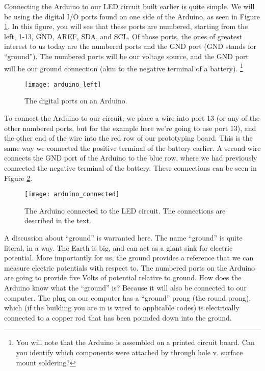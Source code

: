 Connecting the Arduino to our LED circuit built earlier is quite simple. We 
will be using the digital I/O ports found on one side of the Arduino, as 
seen in Figure \ref{fig:arduino_left}. In this figure, you will see that 
these ports are numbered, starting from the left, 1-13, GND, AREF, SDA, and
SCL. Of those ports, the ones of greatest interest to us today are the numbered
ports and the GND port (GND stands for ``ground''). The numbered ports will be
our voltage source, and the GND port will be our ground connection (akin to the
negative terminal of a battery).
\footnote{You will note that the
Arduino is assembled on a printed circuit board. Can you identify which 
components were attached by through hole v. surface mount soldering?}
\begin{figure}[hbp!]
\centering
\texttt{[image: arduino\_left]}
\caption[The digital ports on an Arduino]{The digital ports on an Arduino.}
\label{fig:arduino_left}
\end{figure}

To connect the Arduino to our circuit, we place a wire into port 13 (or any
of the other numbered ports, but for the example here we're going to use port
13), and the other end of the wire into the red row of our prototyping board.
This is the same way we connected the positive terminal of the battery earlier.
A second wire connects the GND port of the Arduino to the blue row, where we
had previously connected the negative terminal of the battery. These 
connections can be seen in Figure \ref{fig:arduino_connected}.
\begin{figure}[hbp!]
\centering
\texttt{[image: arduino\_connected]}
\caption[The Arduino connected to the LED circuit]{The Arduino connected to
the LED circuit. The connections are described in the text.}
\label{fig:arduino_connected}
\end{figure}

A discussion about ``ground'' is warranted here. The name ``ground'' is quite
literal, in a way. The Earth is big, and can act as a giant sink for electric
potential. More importantly for us, the ground provides a reference that we
can measure electric potentials with respect to. The numbered ports on the
Arduino are going to provide five Volts of potential relative to ground. How 
does the Arduino know what the ``ground'' is? Because it will also be connected
to our computer. The plug on our computer has a ``ground'' prong (the round
prong), which (if the building you are in is wired to applicable codes) is 
electrically connected to a copper rod that has been pounded down into the
ground.

